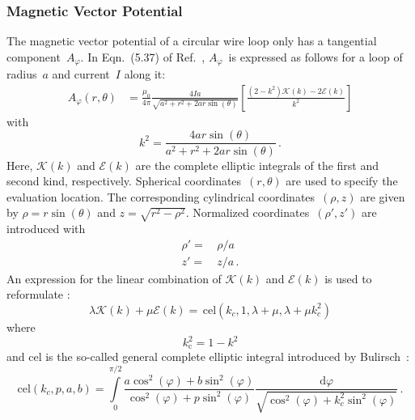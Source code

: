 \subsubsection{Magnetic Vector Potential}
The magnetic vector potential of a circular wire loop
only has a tangential component~$A_\varphi$.
In Eqn.~(5.37) of Ref.~\cite{jackson}, $A_\varphi$~is expressed as
follows for a loop of radius~$a$ and current~$I$ along it:
\begin{align}
  A_\varphi(r, \theta) &= \frac{\mu_0}{4 \pi}
                          \frac{4 I a}{\sqrt{a^2 + r^2 + 2 a r \sin(\theta)}}
                          \left[
                            \frac{(2 - k^2)\mathcal{K}(k) - 2 \mathcal{E}(k)}{k^2}
                          \right] \label{eqn:cwl_A_phi_Jackson}
\end{align}
with
\begin{equation}
  k^2 = \frac{4 a r \sin(\theta)}{a^2 + r^2 + 2 a r \sin(\theta)} \, .
\end{equation}
Here, $\mathcal{K}(k)$ and $\mathcal{E}(k)$ are the complete elliptic integrals of the first and second kind, respectively.
Spherical coordinates~$(r, \theta)$ are used to specify the evaluation location.
The corresponding cylindrical coordinates~$(\rho, z)$ are given by
$\rho = r \sin(\theta)$ and $z = \sqrt{r^2 - \rho^2}$.
Normalized coordinates~$(\rho', z')$ are introduced with
\begin{align}
  \rho' =&\, \rho / a \label{eqn:rhoP} \\
    z'  =&\,   z  / a \label{eqn:zP}   \, .
\end{align}
An expression for the linear combination of $\mathcal{K}(k)$ and $\mathcal{E}(k)$
is used to reformulate :
\begin{equation}
  \lambda \mathcal{K}(k) + \mu \mathcal{E}(k) = \,\mathrm{cel}(k_c, 1, \lambda + \mu, \lambda + \mu k_c^2) \label{eqn:K_E_by_cel}
\end{equation}
where
\begin{equation}
  k_\mathrm{c}^2 = 1 - k^2
\end{equation}
and cel is the so-called general complete elliptic integral
introduced by Bulirsch~\cite{bulirsch_3}:
\begin{equation}
  \mathrm{cel}(k_c, p, a, b) =
  \int\limits_0^{\pi/2}
    \frac{a \cos^2(\varphi) + b \sin^2(\varphi)}
         {\cos^2(\varphi) + p \sin^2(\varphi)}
    \frac{\mathrm{d}\varphi}
         {\sqrt{\cos^2(\varphi) + k_c^2 \sin^2(\varphi)}} \, .
\end{equation}
